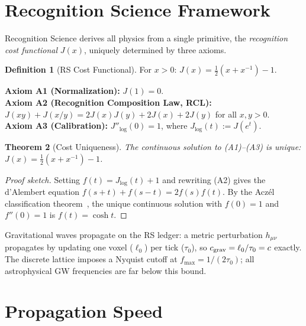 \documentclass[12pt,a4paper]{article}
\newtheorem{theorem}{Theorem}[section]
\theoremstyle{definition}
\newtheorem{definition}[theorem]{Definition}
\theoremstyle{remark}
\begin{document}
\section{Recognition Science Framework}
\label{sec:framework}

Recognition Science derives all physics from a single primitive,
the \emph{recognition cost functional} $J(x)$, uniquely determined
by three axioms.

\begin{definition}[RS Cost Functional]
For $x > 0$: $J(x) = \tfrac{1}{2}(x + x^{-1}) - 1$.
\end{definition}

\noindent\textbf{Axiom A1 (Normalization):} $J(1) = 0$.\\
\textbf{Axiom A2 (Recognition Composition Law, RCL):}
$J(xy) + J(x/y) = 2J(x)J(y) + 2J(x) + 2J(y)$ for all $x, y > 0$.\\
\textbf{Axiom A3 (Calibration):} $J''_{\log}(0) = 1$, where
$J_{\log}(t) := J(e^t)$.

\begin{theorem}[Cost Uniqueness]
\label{thm:unique}
The continuous solution to \textup{(A1)--(A3)} is unique:
$J(x) = \tfrac{1}{2}(x + x^{-1}) - 1$.
\end{theorem}

\begin{proof}[Proof sketch]
Setting $f(t) = J_{\log}(t) + 1$ and rewriting \textup{(A2)} gives the
d'Alembert equation $f(s+t) + f(s-t) = 2f(s)f(t)$.  By the Acz\'el
classification theorem~\cite{Aczel1966}, the unique continuous solution
with $f(0) = 1$ and $f''(0) = 1$ is $f(t) = \cosh t$.
\end{proof}

\noindent Gravitational waves propagate on the RS ledger: a metric perturbation
$h_{\mu\nu}$ propagates by updating one voxel ($\ell_0$) per tick ($\tau_0$),
so $c_{\rm grav} = \ell_0/\tau_0 = c$ exactly.  The discrete lattice
imposes a Nyquist cutoff at $f_{\max} = 1/(2\tau_0)$; all astrophysical GW
frequencies are far below this bound.

\section{Propagation Speed}
\label{sec:speed}
\end{document}

